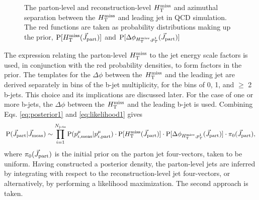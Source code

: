\begin{figure}[h]
\centering
{}
\caption{The parton-level and reconstruction-level $H_{\text{T}}^{\rm miss}$ and azimuthal separation between the $H_{\text{T}}^{\rm miss}$ and leading jet in QCD simulation. The red functions are taken as probability distributions making up the prior, $\text{P}[H_{\text{T}}^{\rm miss}(\vec{J}_{\rm part})]$ and $\text{P}[\Delta\phi_{H_{\text{T}}^{\rm miss},p_{T}^1}(\vec{J}_{\rm part})]$}
\label{fig:Mht}
\end{figure}

The expression relating the parton-level $H_{\text{T}}^{\rm miss}$ to the jet energy scale factors is used, in conjunction with the red probability densities, to form factors in the prior. The templates for the $\Delta\phi$ between the $H_{\text{T}}^{\rm miss}$ and the leading jet are derived separately in bins of the b-jet multiplicity, for the bins of 0, 1, and $\geq$ 2 b-jets.  This choice and its implications are discussed later. For the case of one or more b-jets, the $\Delta\phi$ between the $H_{\text{T}}^{\rm miss}$ and the leading b-jet is used. Combining Eqs. \ref{eq:posterior1} and \ref{eq:likelihood1} gives
\begin{equation}
{\rm P}(\vec{J}_{\rm part}|\vec{J}_{\rm meas}) \sim
\prod_{i=1}^{N_{\rm jets}}{\rm P}(p^{\mu}_{i,\rm meas}|p^{\mu}_{i,\rm part})\cdot \text{P}[H_{\text{T}}^{\rm miss}(\vec{J}_{\rm part})]\cdot \text{P}[\Delta\phi_{H_{\text{T}}^{\rm miss},p_{T}^1}(\vec{J}_{\rm part})]\cdot \pi_0(\vec{J}_{\rm part}),
\end{equation}
where $\pi_0(\vec{J}_{\rm part})$ is the initial prior on the parton jet four-vectors, taken to be uniform. Having constructed a posterior density, the parton-level jets are inferred by integrating with respect to the reconstruction-level jet four-vectors, or alternatively, by performing a likelihood maximization. The second approach is taken.


